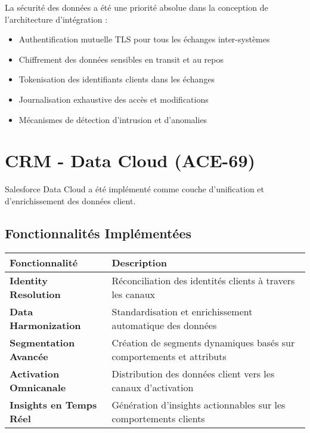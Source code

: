\begin{mdframed}[backgroundcolor=lightgreen!20, linewidth=1pt]
La sécurité des données a été une priorité absolue dans la conception de l'architecture d'intégration :

\begin{itemize}
    \item Authentification mutuelle TLS pour tous les échanges inter-systèmes
    \item Chiffrement des données sensibles en transit et au repos
    \item Tokenisation des identifiants clients dans les échanges
    \item Journalisation exhaustive des accès et modifications
    \item Mécanismes de détection d'intrusion et d'anomalies
\end{itemize}
\end{mdframed}

\section{CRM - Data Cloud (ACE-69)}

Salesforce Data Cloud a été implémenté comme couche d'unification et d'enrichissement des données client.

\subsection{Fonctionnalités Implémentées}

\begin{center}
\begin{tabular}{|>{\bfseries}p{4cm}|p{9.5cm}|}
\hline
\rowcolor{lightblue} Fonctionnalité & Description \\
\hline
Identity Resolution & Réconciliation des identités clients à travers les canaux \\
\hline
Data Harmonization & Standardisation et enrichissement automatique des données \\
\hline
Segmentation Avancée & Création de segments dynamiques basés sur comportements et attributs \\
\hline
Activation Omnicanale & Distribution des données client vers les canaux d'activation \\
\hline
Insights en Temps Réel & Génération d'insights actionnables sur les comportements clients \\
\hline
\end{tabular}
\end{center}

